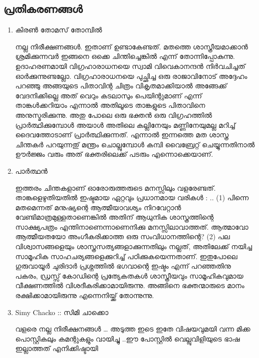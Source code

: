 \subsection*{പ്രതികരണങ്ങള്‍}
\begin{enumerate}
 \item{കിരണ്‍ തോമസ് തോമ്പില്‍}

    നല്ല നിരീക്ഷണങ്ങള്‍. ഇതാണ്‌ ഉണ്ടാകേണ്ടത്‌. മതത്തെ ശാസ്ത്രീയമാക്കാന്‍ ശ്രമിക്കുന്നവര്‍ ഇങ്ങനെ ഒക്കെ ചിന്തിച്ചെങ്കില്‍ എന്ന് തോന്നിപ്പോകുന്നു. ഉദാഹരണമായി വിഗ്രഹാരാധനയെ സ്വാമി വിവെകാനന്ദന്‍ നിര്‍വചിച്ചത്‌ ഓര്‍ക്കുന്നുണ്ടല്ലോ. വിഗ്രഹാരാധനയെ പുച്ഛിച്ച ഒരു രാജാവിനോട്‌ അദ്ദേഹം പറഞ്ഞു അങ്ങയുടെ പിതാവിന്റ ചിത്രം വികൃതമാക്കിയാല്‍ അങ്ങേക്ക്‌ വേദനിക്കില്ലെ അത്‌ വെറും കടലാസും പെയിന്റുമാണ്‌ എന്ന് താങ്കള്‍ക്കറിയാം എന്നാല്‍ അതിലൂടെ താങ്കളുടെ പിതാവിനെ അനുസ്മരിക്കുന്നു. അതു പോലെ ഒരു ഭക്തന്‍ ഒരു വിഗ്രഹത്തില്‍ പ്രാര്‍ത്ഥിക്കുമ്പോള്‍ അയാള്‍ അതിലെ കല്ലിനേയും മണ്ണിനേയുമല്ല മറിച്ച്‌ ദൈവത്തോടാണ്‌ പ്രാര്‍ത്ഥിക്കുന്നത്‌. എന്നാല്‍ ഇന്നത്തെ മത ശാസ്ത്ര ചിന്തകര്‍ പറയുന്നതു് മന്ത്രം ചൊല്ലുമ്പോള്‍ കമ്പി വൈബ്രേറ്റ്‌ ചെയ്യുന്നതിനാല്‍ ഊര്‍ജ്ജം വരും അത്‌ ഭക്തരിലെക്ക്‌ പടരും എന്നൊക്കെയാണ്‌.

 \item{പാര്‍ത്ഥന്‍}

    ഇത്തരം ചിന്തകളാണ്‌ ഓരോരുത്തരുടെ മനസ്സിലും വളരേണ്ടത്‌. താങ്കളെഴുതിയതില്‍ ഇഷ്ടമായ ഏറ്റവും പ്രധാനമായ വരികള്‍ : .. (1) പിന്നെ മതമെന്നത് മനുഷ്യന്റെ ആത്മീയാവശ്യം നിറവേറ്റാന്‍ വേണ്ടിമാത്രമുള്ളതാണെങ്കില്‍ അതിന് ആധുനിക ശാസ്ത്രത്തിന്റെ സാക്ഷ്യപത്രം എന്തിനാണെന്നാണെനിക്കു മനസ്സിലാവാത്തത്. ആത്മാവോ ആത്മീയതയോ അംഗീകരിക്കാത്ത ഒരു സംവിധാനത്തിന്റെ? (2) പല വിശ്വാസങ്ങളെയും ശാസ്ത്രസത്യങ്ങളാക്കുന്നതിലും നല്ലത്, അതിലേക്ക് നയിച്ച സാമൂഹിക സാഹചര്യങ്ങളെക്കുറിച്ച് പഠിക്കുകയെന്നതാണ്. ഇതുപോലെ ഗുരുവായൂര്‍ ചുരിദാര്‍ പ്രശ്നത്തില്‍ ഭഗവാന്റെ ഇഷ്ടം എന്ന് പറഞ്ഞതിനു പകരം, ഡ്രസ്സ്‌ കോഡിന്റെ പ്രത്യേകതകള്‍ ശാസ്ത്രീയവും സാമൂഹികവുമായ വീക്ഷണത്തില്‍ വിശദീകരിക്കാമായിരുന്നു. അങ്ങിനെ ഭക്തന്മാരുടെ മാനം രക്ഷിക്കാമായിരുന്നു എന്നെനിയ്ക്ക്‌ തോന്നുന്നു.
 
  \item{Simy Chacko :: സിമി ചാക്കൊ}

    വളരെ നല്ല നിരീക്ഷനങ്ങള്‍ … അടുത്ത ഇടെ ഇതേ വിഷയവുമയി വന്ന മിക്ക പൊസ്റ്റികലും കമന്റുകളും വായിച്ചു ..ഈ പോസ്റ്റില്‍ വെല്ലുവിളിയുടെ ഭാഷ ഇല്ലാത്തത് എനിക്കിഷ്ടായി
    
\end{enumerate}

\newpage
